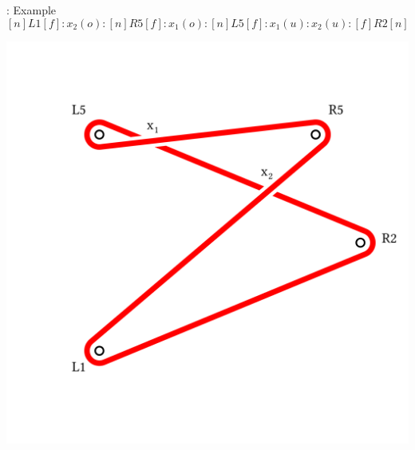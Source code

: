 \begin{frame}{\subsecname: Example}
$$
[n]L1[f]:x_2(o):[n]R5[f]:x_1(o):[n]{L5}[f]:x_1(u):x_2(u):{[f]{R2}[n]}
$$

\begin{center}
\includegraphics[width=0.7\columnwidth]{figures/star-pick.png}
\end{center}
\end{frame}
